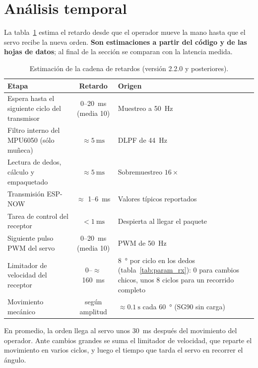\section{Análisis temporal}
\label{sec:latencia}

La tabla~\ref{tab:latencia} estima el retardo desde que el operador mueve la mano hasta que el servo recibe la nueva orden. \textbf{Son estimaciones a partir del código y de las hojas de datos}; al final de la sección se comparan con la latencia medida.

\begin{table}[H]
\centering
\begin{tabularx}{\textwidth}{X c X}
\toprule
\textbf{Etapa} & \textbf{Retardo} & \textbf{Origen} \\
\midrule
Espera hasta el siguiente ciclo del transmisor & 0--\SI{20}{\milli\second} (media 10) & Muestreo a \SI{50}{\hertz} \\
Filtro interno del MPU6050 (sólo muñeca) & $\approx\SI{5}{\milli\second}$ & DLPF de \SI{44}{\hertz} \cite{mpu6050_regmap} \\
Lectura de dedos, cálculo y empaquetado & $\approx\SI{5}{\milli\second}$ & Sobremuestreo $16\times$ \\
Transmisión ESP-NOW & $\approx$ 1--\SI{6}{\milli\second} & Valores típicos reportados \cite{espnow_faq, espnow_issue115} \\
Tarea de control del receptor & $<\SI{1}{\milli\second}$ & Despierta al llegar el paquete \\
Siguiente pulso PWM del servo & 0--\SI{20}{\milli\second} (media 10) & PWM de \SI{50}{\hertz} \\
Limitador de velocidad del receptor & 0--$\approx$\SI{160}{\milli\second} & \SI{8}{\degree} por ciclo en los dedos (tabla~\ref{tab:param_rx}): 0 para cambios chicos, unos 8 ciclos para un recorrido completo \\
Movimiento mecánico & según amplitud & $\approx\SI{0.1}{\second}$ cada \SI{60}{\degree} (SG90 sin carga) \\
\bottomrule
\end{tabularx}
\caption{Estimación de la cadena de retardos (versión 2.2.0 y posteriores).}
\label{tab:latencia}
\end{table}

En promedio, la orden llega al servo unos \SI{30}{\milli\second} después del movimiento del operador. Ante cambios grandes se suma el limitador de velocidad, que reparte el movimiento en varios ciclos, y luego el tiempo que tarda el servo en recorrer el ángulo.

